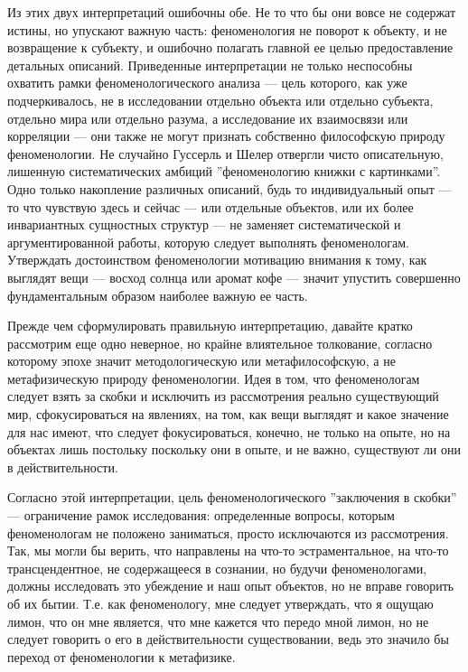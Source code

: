 \documentclass[11pt]{book}
\begin{document}
Из этих двух интерпретаций ошибочны обе. Не то что бы они вовсе не содержат истины, но упускают важную часть: феноменология не поворот к объекту, и не возвращение к субъекту, и ошибочно полагать главной ее целью предоставление детальных описаний. Приведенные интерпретации не только неспособны охватить рамки феноменологического анализа --- цель которого, как уже подчеркивалось, не в исследовании отдельно объекта или отдельно субъекта, отдельно мира или отдельно разума, а исследование их взаимосвязи или корреляции --- они также не могут признать собственно философскую природу феноменологии. Не случайно Гуссерль и Шелер отвергли чисто описательную, лишенную систематических амбиций ''феноменологию книжки с картинками''. Одно только накопление различных описаний, будь то индивидуальный опыт --- то что чувствую здесь и сейчас --- или отдельные объектов, или их более инвариантных сущностных структур --- не заменяет систематической и аргументированной работы, которую следует выполнять феноменологам. Утверждать достоинством феноменологии мотивацию внимания к тому, как выглядят вещи --- восход солнца или аромат кофе --- значит упустить совершенно фундаментальным образом наиболее важную ее часть.

Прежде чем сформулировать правильную интерпретацию, давайте кратко рассмотрим еще одно неверное, но крайне влиятельное толкование, согласно которому эпохе значит методологическую или метафилософскую, а не метафизическую природу феноменологии. Идея в том, что феноменологам следует взять за скобки и исключить из рассмотрения реально существующий мир, сфокусироваться на явлениях, на том, как вещи выглядят и какое значение для нас имеют, что следует фокусироваться, конечно, не только на опыте, но на объектах лишь постольку поскольку они в опыте, и не важно, существуют ли они в действительности.

Согласно этой интерпретации, цель феноменологического ''заключения в скобки'' --- ограничение рамок исследования: определенные вопросы, которым феноменологам не положено заниматься, просто исключаются из рассмотрения. Так, мы могли бы верить, что направлены на что-то эстраментальное, на что-то трансцендентное, не содержащееся в сознании, но будучи феноменологами, должны исследовать это убеждение и наш опыт объектов, но не вправе говорить об их бытии. Т.е. как феноменологу, мне следует утверждать, что я ощущаю лимон, что он мне является, что мне кажется что передо мной лимон, но не следует говорить о его в действительности существовании, ведь это значило бы переход от феноменологии к метафизике.
\end{document}
